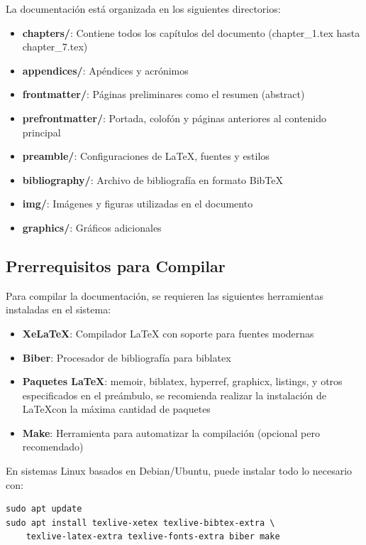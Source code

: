 La documentación está organizada en los siguientes directorios:

\begin{itemize}
    \item \textbf{chapters/}: Contiene todos los capítulos del documento (chapter\_1.tex hasta chapter\_7.tex)
    \item \textbf{appendices/}: Apéndices y acrónimos
    \item \textbf{frontmatter/}: Páginas preliminares como el resumen (abstract)
    \item \textbf{prefrontmatter/}: Portada, colofón y páginas anteriores al contenido principal
    \item \textbf{preamble/}: Configuraciones de LaTeX, fuentes y estilos
    \item \textbf{bibliography/}: Archivo de bibliografía en formato BibTeX
    \item \textbf{img/}: Imágenes y figuras utilizadas en el documento
    \item \textbf{graphics/}: Gráficos adicionales
\end{itemize}

\subsection{Prerrequisitos para Compilar}

Para compilar la documentación, se requieren las siguientes herramientas instaladas en el sistema:

\begin{itemize}
    \item \textbf{XeLaTeX}: Compilador LaTeX con soporte para fuentes modernas
    \item \textbf{Biber}: Procesador de bibliografía para biblatex
    \item \textbf{Paquetes LaTeX}: memoir, biblatex, hyperref, graphicx, listings, y otros especificados en el preámbulo, se recomienda realizar la instalación de \LaTeX con la máxima cantidad de paquetes
    \item \textbf{Make}: Herramienta para automatizar la compilación (opcional pero recomendado)
\end{itemize}

En sistemas Linux basados en Debian/Ubuntu, puede instalar todo lo necesario con:

\begin{lstlisting}[style=bash]
sudo apt update
sudo apt install texlive-xetex texlive-bibtex-extra \
    texlive-latex-extra texlive-fonts-extra biber make
\end{lstlisting}

